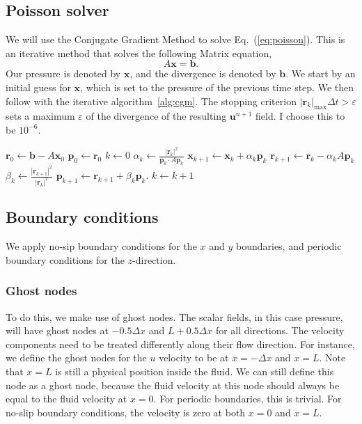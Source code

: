 \documentclass[fleqn,a4paper]{article} %
\numberwithin{equation}{section} %
\numberwithin{figure}{section} %
\numberwithin{algorithm}{section} %
\begin{document}
\subsection{Poisson solver}\label{subsec:Poisson solver}
We will use the Conjugate Gradient Method to solve Eq.~(\ref{eq:poisson}). This is an iterative method that solves the following Matrix equation,
\begin{equation}
    A \bm{x} = \bm{b}. 
\end{equation}
Our pressure is denoted by $\bm{x}$, and the divergence is denoted by $\bm{b}$. We start by an initial guess for $\bm{x}$, which is set to the pressure of the previous time step. We then follow with the iterative algorithm~\ref{alg:cgm}. The stopping criterion $|\bm{r}_k|_\text{max}\Delta t > \varepsilon$ sets a maximum $\varepsilon$ of the divergence of the resulting $\bm{u}^{n+1}$ field. I choose this to be $10^{-6}$. 
\begin{algorithm}
\caption{The algorithm used to implement the Conjugate Gradient Method}\label{alg:cgm}
\begin{algorithmic}
\State $\bm{r}_0 \gets \bm{b} - A \bm{x}_0$ 
\State $\bm{p}_0 \gets \bm{r}_0$
\State $k \gets 0$
    \State $\alpha_k \gets \frac{|\bm{r}_k|^2}{\bm{p}_k \cdot A \bm{p}_k}$
    \State $\bm{x}_{k+1} \gets \bm{x}_{k} + \alpha_k \bm{p}_k$
    \State $\bm{r}_{k+1} \gets \bm{r}_{k} - \alpha_k A \bm{p}_k$
    \State $\beta_k \gets \frac{|\bm{r}_{k+1}|^2}{|\bm{r}_{k}|^2}$
    \State $\bm{p}_{k+1}\gets \bm{r}_{k+1} + \beta_k \bm{p}_k$. 
    \State $k \gets k+1$
\EndWhile
\end{algorithmic}
\end{algorithm}
\subsection{Boundary conditions}
We apply no-sip boundary conditions for the $x$ and $y$ boundaries, and periodic boundary conditions for the $z$-direction. 
\subsubsection{Ghost nodes}
To do this, we make use of ghost nodes. The scalar fields, in this case pressure, will have ghost nodes at $-0.5 \Delta x$ and $L + 0.5 \Delta x$ for all directions. The velocity components need to be treated differently along their flow direction. For instance, we define the ghost nodes for the $u$ velocity to be at $x = -\Delta x$ and $x = L$. Note that $x = L$ is still a physical position inside the fluid. We can still define this node as a ghost node, because the fluid velocity at this node should always be equal to the fluid velocity at $x = 0$. For periodic boundaries, this is trivial. For no-slip boundary conditions, the velocity is zero at both $x = 0$ and $x = L$. 
\end{document}
